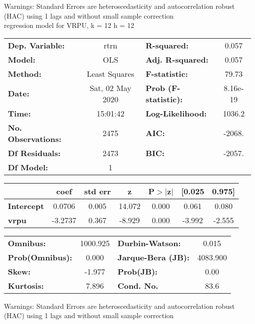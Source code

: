 Warnings: \newline
 [1] Standard Errors are heteroscedasticity and autocorrelation robust (HAC) using 1 lags and without small sample correction\\ 

regression model for VRPU, k = 12 h = 12\begin{center}
\begin{tabular}{lclc}
\toprule
\textbf{Dep. Variable:}    &       rtrn       & \textbf{  R-squared:         } &     0.057   \\
\textbf{Model:}            &       OLS        & \textbf{  Adj. R-squared:    } &     0.057   \\
\textbf{Method:}           &  Least Squares   & \textbf{  F-statistic:       } &     79.73   \\
\textbf{Date:}             & Sat, 02 May 2020 & \textbf{  Prob (F-statistic):} &  8.16e-19   \\
\textbf{Time:}             &     15:01:42     & \textbf{  Log-Likelihood:    } &    1036.2   \\
\textbf{No. Observations:} &        2475      & \textbf{  AIC:               } &    -2068.   \\
\textbf{Df Residuals:}     &        2473      & \textbf{  BIC:               } &    -2057.   \\
\textbf{Df Model:}         &           1      & \textbf{                     } &             \\
\bottomrule
\end{tabular}
\begin{tabular}{lcccccc}
                   & \textbf{coef} & \textbf{std err} & \textbf{z} & \textbf{P$> |$z$|$} & \textbf{[0.025} & \textbf{0.975]}  \\
\midrule
\textbf{Intercept} &       0.0706  &        0.005     &    14.072  &         0.000        &        0.061    &        0.080     \\
\textbf{vrpu}      &      -3.2737  &        0.367     &    -8.929  &         0.000        &       -3.992    &       -2.555     \\
\bottomrule
\end{tabular}
\begin{tabular}{lclc}
\textbf{Omnibus:}       & 1000.925 & \textbf{  Durbin-Watson:     } &    0.015  \\
\textbf{Prob(Omnibus):} &   0.000  & \textbf{  Jarque-Bera (JB):  } & 4083.900  \\
\textbf{Skew:}          &  -1.977  & \textbf{  Prob(JB):          } &     0.00  \\
\textbf{Kurtosis:}      &   7.896  & \textbf{  Cond. No.          } &     83.6  \\
\bottomrule
\end{tabular}
\end{center}

Warnings: \newline
 [1] Standard Errors are heteroscedasticity and autocorrelation robust (HAC) using 1 lags and without small sample correction\\ 

